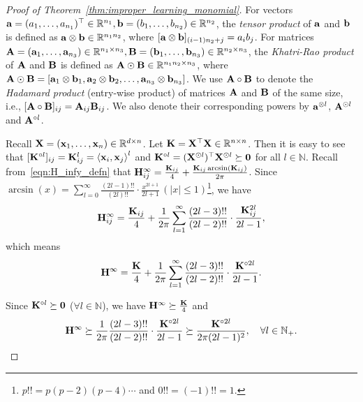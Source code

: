 \begin{proof}[Proof of Theorem~\ref{thm:improper_learning_monomial}]
	
	For vectors $\mathbf{a} = (a_1, \ldots, a_{n_1})^\top \in \mathbb{R}^{n_1}, \mathbf{b} = (b_1, \ldots, b_{n_2}) \in\mathbb{R}^{n_2}$, the \emph{tensor product} of $\mathbf{a}$ and $\mathbf{b}$ is defined as $\mathbf{a}\otimes\mathbf{b}\in\mathbb{R}^{n_1 n_2}$, where 
	$[\mathbf{a}\otimes\mathbf{b}]_{(i-1)n_2+j} = a_ib_j $.
	For matrices $\mathbf{A} = (\mathbf{a}_1, \ldots, \mathbf{a}_{n_3}) \in\mathbb{R}^{n_1\times n_3}, \mathbf{B} = (\mathbf{b}_1, \ldots, \mathbf{b}_{n_3}) \in\mathbb{R}^{n_2\times n_3}$,  the \emph{Khatri-Rao product} of $\mathbf{A}$ and $\mathbf{B}$ is defined as  $\mathbf{A}\odot \mathbf{B}\in\mathbb{R}^{n_1n_2\times n_3}$, where $\mathbf{A}\odot \mathbf{B} = [\mathbf{a}_1\otimes \mathbf{b}_1, \mathbf{a}_2\otimes \mathbf{b}_2, \ldots, \mathbf{a}_{n_3}\otimes \mathbf{b}_{n_3}]$. We use $\mathbf{A}\circ \mathbf{B}$ to denote the \emph{Hadamard product} (entry-wise product) of matrices $\mathbf{A}$ and $\mathbf{B}$ of the same size, i.e., $[\mathbf{A} \circ \mathbf{B}]_{ij} = \mathbf{A}_{ij} \mathbf{B}_{ij}$.
	We also denote their corresponding powers by $\mathbf{a}^{\otimes l}$, $\mathbf{A}^{\odot l}$ and $\mathbf{A}^{\circ l}$.
	
	Recall $\mathbf{X} = (\mathbf{x}_1, \ldots, \mathbf{x}_n) \in \mathbb{R}^{d\times n}$.
	Let  $\mathbf{K} = \mathbf{X}^\top \mathbf{X} \in \mathbb{R}^{n \times n}$.
	Then it is easy to see that $[\mathbf{K}^{\circ l}]_{ij} = \mathbf{K}^l_{ij} = \left\langle \mathbf{x}_i,\mathbf{x}_j\right\rangle^l$ and $\mathbf{K}^{\circ l} = (\mathbf{X}^{\odot l})^\top \mathbf{X}^{\odot l}\succeq \bm{0}$ for all $l\in\mathbb N$.
	Recall from~\eqref{eqn:H_infy_defn} that $\mathbf{H}^\infty_{ij} = \frac{\mathbf{K}_{ij}}{4}+ \frac{\mathbf{K}_{ij} \arcsin(\mathbf{K}_{ij})}{2\pi}$. 
	Since  $\arcsin(x) = \sum_{l=0}^\infty \frac{(2l-1)!!}{(2l)!!}\cdot \frac{x^{2l+1}}{2l+1}\, (|x|\le1)$\footnote{$p!! = p(p-2)(p-4)\cdots$ and $0!!=(-1)!!=1$.},  we have 
	\[ \mathbf{H}^\infty_{ij} = \frac{\mathbf{K}_{ij}}{4}+ \frac{1}{2\pi} \sum_{l=1}^\infty \frac{(2l-3)!!}{(2l-2)!!}\cdot \frac{\mathbf{K}_{ij}^{2l}}{2l-1},\]
	which means
	\[ \mathbf{H}^\infty = \frac{\mathbf{K}}{4}+ \frac{1}{2\pi} \sum_{l=1}^\infty \frac{(2l-3)!!}{(2l-2)!!}\cdot \frac{\mathbf{K}^{\circ 2l}}{2l-1}.\]
	
	Since $\mathbf{K}^{\circ l}\succeq \bm{0}$ ($\forall l\in \mathbb{N}$), we have 
	$ \mathbf{H}^\infty \succeq \frac{\mathbf{K}}{4}$ and 
	\[  \mathbf{H}^\infty \succeq \frac{1}{2\pi} \frac{(2l-3)!!}{(2l-2)!!}\cdot \frac{\mathbf{K}^{\circ 2l}}{2l-1} \succeq \frac{\mathbf{K}^{\circ 2l}}{2\pi(2l-1)^2}, \quad \forall l\in\mathbb N_+.\]
	

\end{proof}
